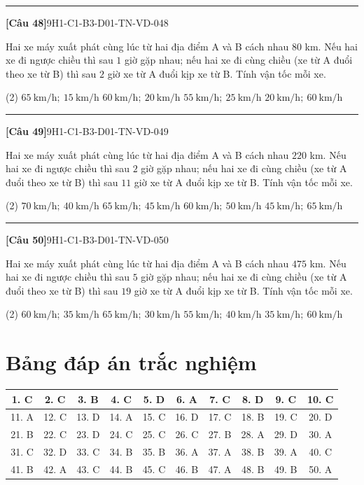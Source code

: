 \documentclass[12pt,a4paper]{article}
\newif\ifloigiai
\newenvironment{cauhoi}[2]{%
  \par\medskip\noindent\rule{\textwidth}{0.4pt}\par\nopagebreak
  \noindent\textbf{[#1]}\hfill{\scriptsize\ttfamily #2}\par\nopagebreak\smallskip}{\par}
\newcommand{\dapan}[1]{\ifloigiai\par\smallskip\noindent\textit{Đáp án:} \textbf{#1}\par\fi}
\begin{document}
\begin{cauhoi}{Câu 48}{9H1-C1-B3-D01-TN-VD-048}
Hai xe máy xuất phát cùng lúc từ hai địa điểm A và B cách nhau $80$ km. Nếu hai xe đi ngược chiều thì sau $1$ giờ gặp nhau; nếu hai xe đi cùng chiều (xe từ A đuổi theo xe từ B) thì sau $2$ giờ xe từ A đuổi kịp xe từ B. Tính vận tốc mỗi xe.
\begin{tasks}(2)
\task $65\ \text{km/h};\ 15\ \text{km/h}$
\task $60\ \text{km/h};\ 20\ \text{km/h}$
\task $55\ \text{km/h};\ 25\ \text{km/h}$
\task $20\ \text{km/h};\ 60\ \text{km/h}$
\end{tasks}
\dapan{B}
\end{cauhoi}
\begin{cauhoi}{Câu 49}{9H1-C1-B3-D01-TN-VD-049}
Hai xe máy xuất phát cùng lúc từ hai địa điểm A và B cách nhau $220$ km. Nếu hai xe đi ngược chiều thì sau $2$ giờ gặp nhau; nếu hai xe đi cùng chiều (xe từ A đuổi theo xe từ B) thì sau $11$ giờ xe từ A đuổi kịp xe từ B. Tính vận tốc mỗi xe.
\begin{tasks}(2)
\task $70\ \text{km/h};\ 40\ \text{km/h}$
\task $65\ \text{km/h};\ 45\ \text{km/h}$
\task $60\ \text{km/h};\ 50\ \text{km/h}$
\task $45\ \text{km/h};\ 65\ \text{km/h}$
\end{tasks}
\dapan{B}
\end{cauhoi}
\begin{cauhoi}{Câu 50}{9H1-C1-B3-D01-TN-VD-050}
Hai xe máy xuất phát cùng lúc từ hai địa điểm A và B cách nhau $475$ km. Nếu hai xe đi ngược chiều thì sau $5$ giờ gặp nhau; nếu hai xe đi cùng chiều (xe từ A đuổi theo xe từ B) thì sau $19$ giờ xe từ A đuổi kịp xe từ B. Tính vận tốc mỗi xe.
\begin{tasks}(2)
\task $60\ \text{km/h};\ 35\ \text{km/h}$
\task $65\ \text{km/h};\ 30\ \text{km/h}$
\task $55\ \text{km/h};\ 40\ \text{km/h}$
\task $35\ \text{km/h};\ 60\ \text{km/h}$
\end{tasks}
\dapan{A}
\end{cauhoi}
\clearpage\section*{Bảng đáp án trắc nghiệm}
\begin{center}\begin{tabular}{|c|c|c|c|c|c|c|c|c|c|}
\hline
1. C & 2. C & 3. B & 4. C & 5. D & 6. A & 7. C & 8. D & 9. C & 10. C\\\hline
11. A & 12. C & 13. D & 14. A & 15. C & 16. D & 17. C & 18. B & 19. C & 20. D\\\hline
21. B & 22. C & 23. D & 24. C & 25. C & 26. C & 27. B & 28. A & 29. D & 30. A\\\hline
31. C & 32. D & 33. C & 34. B & 35. B & 36. A & 37. A & 38. B & 39. A & 40. C\\\hline
41. B & 42. A & 43. C & 44. B & 45. C & 46. B & 47. A & 48. B & 49. B & 50. A\\\hline
\end{tabular}\end{center}
\end{document}
